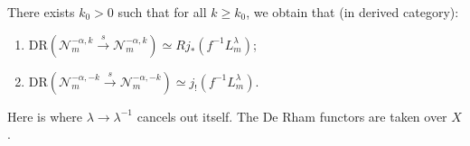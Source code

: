 \begin{proposition}\label{prop:20.8}
    There exists $k_0 > 0$ such that for all $k \geq k_0$, we obtain that (in derived category):
    \begin{enumerate}
        \item $\mathrm{DR}(\mathcal{N}_m^{-\alpha,k} \xrightarrow{s} \mathcal{N}_{m}^{-\alpha,k}) \simeq R j_*\left(f^{-1} L_m^{\lambda}\right)$;
        \item $\mathrm{DR}(\mathcal{N}_m^{-\alpha,-k} \xrightarrow{s} \mathcal{N}_{m}^{-\alpha,-k})\simeq j_!\left(f^{-1} L_m^{\lambda}\right)$.
    \end{enumerate}
\end{proposition}
\begin{remark}
    Here is where $\lambda\to {\lambda^{-1}}$ cancels out itself.
    The De Rham functors are taken over $X$.
\end{remark}
